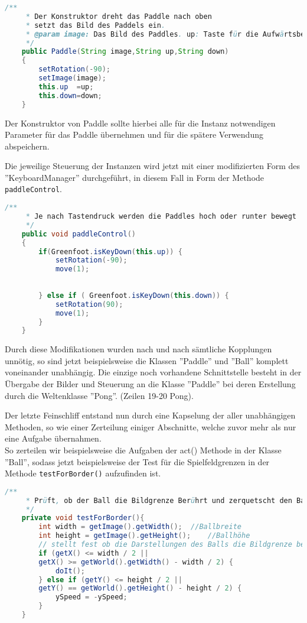\documentclass{pi1}
\begin{document}
\begin{lstlisting}[caption={Konstruktor Paddle}, firstnumber=24, language=Java]
/**
     * Der Konstruktor dreht das Paddle nach oben
     * setzt das Bild des Paddels ein.
     * @param image: Das Bild des Paddles. up: Taste für die Aufwärtsbewegung. down: Taste für die Abwärtsbewegung.
     */
    public Paddle(String image,String up,String down)
    {
        setRotation(-90);
        setImage(image);
        this.up  =up;
        this.down=down;
    }
\end{lstlisting}
Der Konstruktor von Paddle sollte hierbei alle für die Instanz notwendigen Parameter für das Paddle übernehmen und für die spätere Verwendung abspeichern.

Die jeweilige Steuerung der Instanzen wird jetzt mit einer modifizierten Form des ''KeyboardManager'' durchgeführt, in diesem Fall in Form der Methode \texttt{paddleControl}.
\begin{lstlisting}[caption={Methode \emph{paddleControl()} der Klasse Paddle}, firstnumber=47, language=Java]
/**
     * Je nach Tastendruck werden die Paddles hoch oder runter bewegt
     */
    public void paddleControl() 
    {
        if(Greenfoot.isKeyDown(this.up)) {
            setRotation(-90);
            move(1);
            
            
        } else if ( Greenfoot.isKeyDown(this.down)) {
            setRotation(90);
            move(1);
        }
    }
\end{lstlisting}
Durch diese Modifikationen wurden nach und nach sämtliche Kopplungen unnötig, so sind jetzt beispielsweise die Klassen ''Paddle'' und ''Ball'' komplett voneinander unabhängig.
Die einzige noch vorhandene Schnittstelle besteht in der Übergabe der Bilder und Steuerung an die Klasse ''Paddle'' bei deren Erstellung durch die Weltenklasse ''Pong''. (Zeilen 19-20 Pong).\newline

Der letzte Feinschliff entstand nun durch eine Kapselung der aller unabhängigen Methoden,
so wie einer Zerteilung einiger Abschnitte, welche zuvor mehr als nur eine Aufgabe übernahmen.\\
So zerteilen wir beispielsweise die Aufgaben der act() Methode in der Klasse ''Ball'', sodass jetzt beispielsweise der Test für die Spielfeldgrenzen in der Methode \texttt{testForBorder()} aufzufinden ist.

\begin{lstlisting}[caption={\emph{testForBorder()} Methode in Ball}, firstnumber=123, language=Java]
/**
     * Prüft, ob der Ball die Bildgrenze Berührt und zerquetscht den Ball falls dem so ist.
     */
    private void testForBorder(){
        int width = getImage().getWidth();  //Ballbreite
        int height = getImage().getHeight();    //Ballhöhe
        // stellt fest ob die Darstellungen des Balls die Bildgrenze berührt
        if (getX() <= width / 2 ||  
        getX() >= getWorld().getWidth() - width / 2) {
            doIt();
        } else if (getY() <= height / 2 ||
        getY() == getWorld().getHeight() - height / 2) {
            ySpeed = -ySpeed;
        }
    }
\end{lstlisting}
\end{document}
